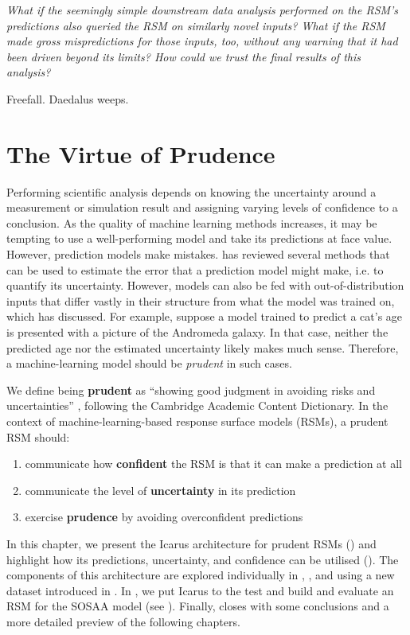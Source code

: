 {\selectfont
\newpar \textit{What if the seemingly simple downstream data analysis performed on the RSM's predictions also queried the RSM on similarly novel inputs? What if the RSM made gross mispredictions for those inputs, too, without any warning that it had been driven beyond its limits? How could we trust the final results of this analysis?}

\newpar Freefall. Daedalus weeps.
}

\section{The Virtue of Prudence} \label{txt:prudent-rsm}

Performing scientific analysis depends on knowing the uncertainty around a measurement or simulation result and assigning varying levels of confidence to a conclusion. As the quality of machine learning methods increases, it may be tempting to use a well-performing model and take its predictions at face value. However, prediction models make mistakes.  has reviewed several methods that can be used to estimate the error that a prediction model might make, i.e. to quantify its uncertainty. However, models can also be fed with out-of-distribution inputs that differ vastly in their structure from what the model was trained on, which  has discussed. For example, suppose a model trained to predict a cat's age is presented with a picture of the Andromeda galaxy. In that case, neither the predicted age nor the estimated uncertainty likely makes much sense. Therefore, a machine-learning model should be \textit{prudent} in such cases.

\newpar We define being \textbf{prudent} as ``showing good judgment in avoiding risks and uncertainties'' \cite{prudent-dictionary-2023}, following the Cambridge Academic Content Dictionary. In the context of machine-learning-based response surface models (RSMs), a prudent RSM should:
\begin{enumerate}
    \item communicate how \textbf{confident} the RSM is that it can make a prediction at all
    \item communicate the level of \textbf{uncertainty} in its prediction
    \item exercise \textbf{prudence} by avoiding overconfident predictions
\end{enumerate}
\noindent In this chapter, we present the Icarus architecture for prudent RSMs () and highlight how its predictions, uncertainty, and confidence can be utilised (). The components of this architecture are explored individually in , , and  using a new dataset introduced in . In , we put Icarus to the test and build and evaluate an RSM for the SOSAA model (see ). Finally,  closes with some conclusions and a more detailed preview of the following chapters.

